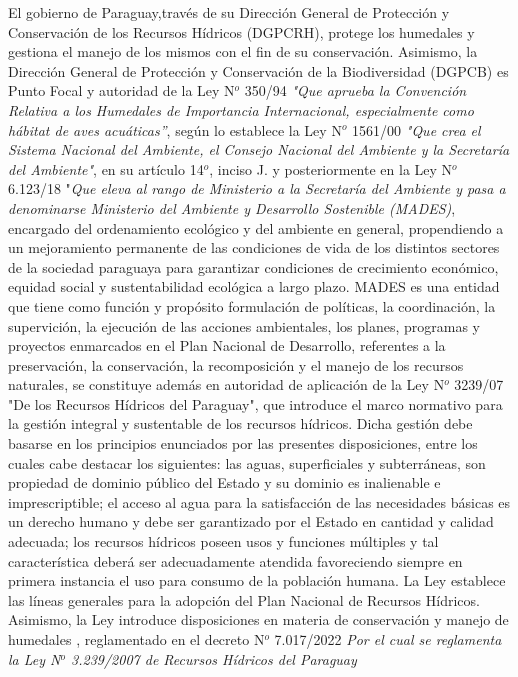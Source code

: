 El gobierno de Paraguay,trav\'es de su Direcci\'on General de Protecci\'on y Conservaci\'on de los Recursos H\'idricos (DGPCRH), protege los humedales y gestiona el manejo de los mismos con el fin de su conservaci\'on. Asimismo, la Direcci\'on General de Protecci\'on y Conservaci\'on de la Biodiversidad (DGPCB) es Punto Focal y autoridad de la Ley N$^{o}$ 350/94 \textit{"Que aprueba la Convenci\'on Relativa a los Humedales de Importancia Internacional, especialmente como h\'abitat de aves acu\'aticas”}, 
seg\'un lo establece la Ley N$^{o}$ 1561/00 \textit{"Que crea el Sistema Nacional del Ambiente, el Consejo Nacional del Ambiente y la Secretar\'ia del Ambiente"}, en su art\'iculo 14$^{o}$, inciso J. \cite{direccion_general_de_proteccion_y_sitios_nodate} 
y posteriormente en la Ley N$^{o}$ 6.123/18 "\textit{Que eleva al rango de Ministerio a la Secretar\'ia del Ambiente y pasa a denominarse Ministerio del Ambiente y Desarrollo Sostenible (MADES)},
encargado del ordenamiento ecol\'ogico y del ambiente en general, propendiendo a un mejoramiento permanente de las condiciones de vida de los distintos sectores de la sociedad paraguaya para garantizar condiciones de crecimiento econ\'omico, equidad social y sustentabilidad ecol\'ogica a largo plazo. MADES es una entidad que tiene como funci\'on y prop\'osito formulaci\'on de pol\'iticas, la coordinaci\'on, la supervici\'on, la ejecuci\'on de las acciones ambientales, los planes, programas y proyectos enmarcados en el Plan Nacional de Desarrollo, referentes a la preservaci\'on, la conservaci\'on, la recomposici\'on y el manejo de los recursos naturales\cite{mades_antecedentes_nodate}, se constituye además  en autoridad de aplicación de la Ley N$^{o}$ 3239/07 "De los Recursos Hídricos del Paraguay"\cite{noauthor_presidente_nodate}, que introduce el marco normativo para la gestión integral y sustentable de los recursos hídricos. 
Dicha gestión debe basarse en los principios enunciados por las presentes disposiciones, entre los cuales cabe destacar los siguientes: las aguas, superficiales y subterráneas, son propiedad de dominio público del Estado y su dominio es inalienable e imprescriptible;  el acceso al agua para la satisfacción de las necesidades básicas es un derecho humano y debe ser garantizado por el Estado en cantidad y calidad adecuada; los recursos hídricos poseen usos y funciones múltiples y tal característica deberá ser adecuadamente atendida favoreciendo siempre en primera instancia el uso para consumo de la población humana. La Ley establece las líneas generales para la adopción del Plan Nacional de Recursos Hídricos. Asimismo, la Ley introduce disposiciones en materia de conservación y manejo de humedales \cite{ley_n_323907_ley_2007}, reglamentado en el  decreto N$^{o}$ 7.017/2022 \textit{Por el cual se reglamenta la Ley N$^{o}$ 3.239/2007 de Recursos Hídricos del Paraguay}


